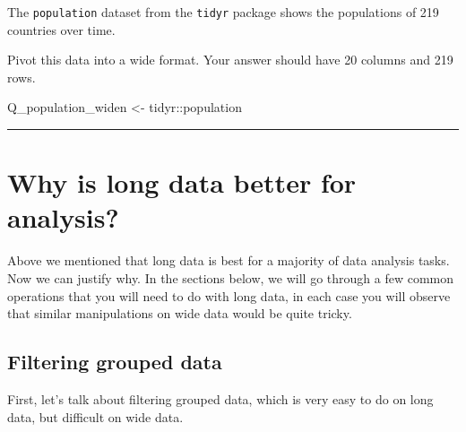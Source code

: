 \documentclass[
  letterpaper,
  DIV=11,
  numbers=noendperiod]{scrreprt}
\newenvironment{Shaded}{\begin{snugshade}}{\end{snugshade}}
\newcommand{\NormalTok}[1]{\textcolor[rgb]{0.00,0.23,0.31}{#1}}
\newcommand{\OtherTok}[1]{\textcolor[rgb]{0.00,0.23,0.31}{#1}}
\newcommand{\SpecialCharTok}[1]{\textcolor[rgb]{0.37,0.37,0.37}{#1}}
\begin{document}
\begin{tcolorbox}[enhanced jigsaw, colframe=quarto-callout-tip-color-frame, rightrule=.15mm, opacityback=0, breakable, coltitle=black, colbacktitle=quarto-callout-tip-color!10!white, bottomrule=.15mm, leftrule=.75mm, toprule=.15mm, arc=.35mm, bottomtitle=1mm, colback=white, left=2mm, opacitybacktitle=0.6, titlerule=0mm, title=\textcolor{quarto-callout-tip-color}{\faLightbulb}\hspace{0.5em}{Practice}, toptitle=1mm]

The \texttt{population} dataset from the \texttt{tidyr} package shows
the populations of 219 countries over time.

Pivot this data into a wide format. Your answer should have 20 columns
and 219 rows.

\begin{Shaded}
\begin{Highlighting}[]
\NormalTok{Q\_population\_widen }\OtherTok{\textless{}{-}} 
\NormalTok{  tidyr}\SpecialCharTok{::}\NormalTok{population}
\end{Highlighting}
\end{Shaded}

\end{tcolorbox}

\begin{center}\rule{0.5\linewidth}{0.5pt}\end{center}

\hypertarget{why-is-long-data-better-for-analysis}{%
\section{Why is long data better for
analysis?}\label{why-is-long-data-better-for-analysis}}

Above we mentioned that long data is best for a majority of data
analysis tasks. Now we can justify why. In the sections below, we will
go through a few common operations that you will need to do with long
data, in each case you will observe that similar manipulations on wide
data would be quite tricky.

\hypertarget{filtering-grouped-data}{%
\subsection{Filtering grouped data}\label{filtering-grouped-data}}

First, let's talk about filtering grouped data, which is very easy to do
on long data, but difficult on wide data.
\end{document}
